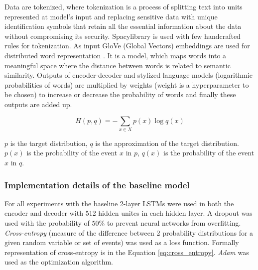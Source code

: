 Data are tokenized, where tokenization is a process of splitting text into units represented at model's input and replacing sensitive data with unique identification symbols that retain all the essential information about the data without compromising its security. Spacy\protect\footnotemark library is used with few handcrafted rules for tokenization. As input GloVe (Global Vectors) embeddings are used for distributed word representation \cite{pennington2014glove}. It is a model, which maps words into a meaningful space where the distance between words is related to semantic similarity. Outputs of encoder-decoder and stylized language models (logarithmic probabilities of words) are multiplied by weights (weight is a hyperparameter to be chosen) to increase or decrease the probability of words and finally these outputs are added up.


\begin{eqfloat}
\begin{equation} \label{eq:cross_entropy}
H(p,q) = -\sum_{x \in X} p(x)\log q(x)
\end{equation}
\caption{$p$ is the target distribution, $q$ is the approximation of the target distribution. $p(x)$ is the probability of the event $x$ in $p$, $q(x)$ is the probability of the event $x$ in $q$.}
\end{eqfloat}

\subsubsection{Implementation details of the baseline model}
For all experiments with the baseline 2-layer LSTMs were used in both the encoder and decoder with 512 hidden unites in each hidden layer. A dropout \cite{srivastava2014dropout} was used with the probability of $50\%$ to prevent neural networks from overfitting. \textit{Cross-entropy} (measure of the difference between 2 probability distributions for a given random variable or set of events) was used as a loss function. Formally representation of cross-entropy is in the Equation \ref{eq:cross_entropy}. \textit{Adam} \cite{kingma2014adam} was used as the optimization algorithm.


